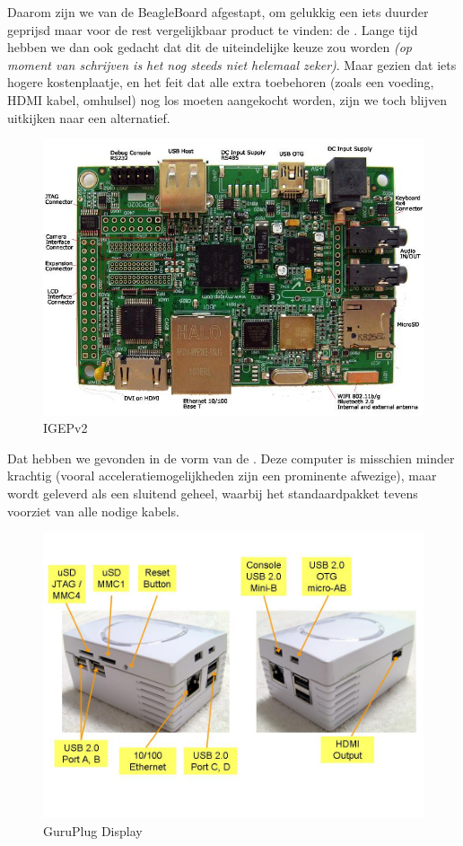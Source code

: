 Daarom zijn we van de BeagleBoard afgestapt, om gelukkig een iets duurder geprijsd maar voor de rest vergelijkbaar product te vinden: de \textbf{}. Lange tijd hebben we dan ook gedacht dat dit de uiteindelijke keuze zou worden \textit{(op moment van schrijven is het nog steeds niet helemaal zeker)}. Maar gezien dat iets hogere kostenplaatje, en het feit dat alle extra toebehoren (zoals een voeding, HDMI kabel, omhulsel) nog los moeten aangekocht worden, zijn we toch blijven uitkijken naar een alternatief.

\begin{figure}
	\includegraphics[width=\textwidth]{afbeeldingen/IGEPv2}
	\caption{IGEPv2}
\end{figure}

Dat hebben we gevonden in de vorm van de \textbf{}. Deze computer is misschien minder krachtig (vooral acceleratiemogelijkheden zijn een prominente afwezige), maar wordt geleverd als een sluitend geheel, waarbij het standaardpakket tevens voorziet van alle nodige kabels.

\begin{figure}
	\includegraphics[width=\textwidth]{afbeeldingen/GuruPlug_Display}
	\caption{GuruPlug Display}
\end{figure}
